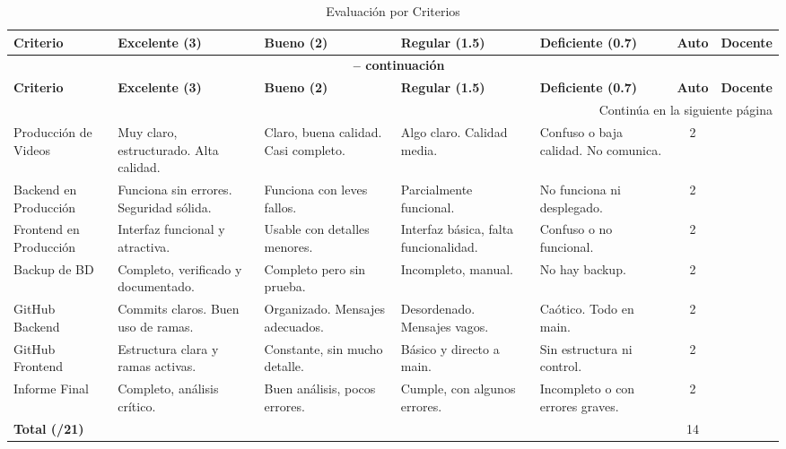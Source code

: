 \documentclass{article}
\begin{document}
       \renewcommand{\arraystretch}{1.3}
       \newpage
\begin{longtable}{|p{2.4cm}|p{2.5cm}|p{2.3cm}|p{2.3cm}|p{2.3cm}|c|c|}
\caption{Evaluación por Criterios} \\
\hline
\textbf{Criterio} &
\textbf{Excelente (3)} &
\textbf{Bueno (2)} &
\textbf{Regular (1.5)} &
\textbf{Deficiente (0.7)} &
\textbf{Auto} &
\textbf{Docente} \\
\hline
\endfirsthead

\multicolumn{7}{c}{{\bfseries \tablename\ \thetable{} -- continuación}} \\
\hline
\textbf{Criterio} &
\textbf{Excelente (3)} &
\textbf{Bueno (2)} &
\textbf{Regular (1.5)} &
\textbf{Deficiente (0.7)} &
\textbf{Auto} &
\textbf{Docente} \\
\hline
\endhead

\hline \multicolumn{7}{|r|}{{Continúa en la siguiente página}} \\ \hline
\endfoot

\hline
\endlastfoot

Producción de Videos &
Muy claro, estructurado. Alta calidad. &
Claro, buena calidad. Casi completo. &
Algo claro. Calidad media. &
Confuso o baja calidad. No comunica. &
 2 & \\
\hline

Backend en Producción &
Funciona sin errores. Seguridad sólida. &
Funciona con leves fallos. &
Parcialmente funcional. &
No funciona ni desplegado. &
 2 & \\
\hline

Frontend en Producción &
Interfaz funcional y atractiva. &
Usable con detalles menores. &
Interfaz básica, falta funcionalidad. &
Confuso o no funcional. &
 2 & \\
\hline

Backup de BD &
Completo, verificado y documentado. &
Completo pero sin prueba. &
Incompleto, manual. &
No hay backup. &
 2 & \\
\hline

GitHub Backend &
Commits claros. Buen uso de ramas. &
Organizado. Mensajes adecuados. &
Desordenado. Mensajes vagos. &
Caótico. Todo en main. &
 2 & \\
\hline

GitHub Frontend &
Estructura clara y ramas activas. &
Constante, sin mucho detalle. &
Básico y directo a main. &
Sin estructura ni control. &
 2 & \\
\hline

Informe Final &
Completo, análisis crítico. &
Buen análisis, pocos errores. &
Cumple, con algunos errores. &
Incompleto o con errores graves. &
 2 & \\
\hline

\textbf{Total (/21)} & & & & & 14 & \\
\hline
\end{longtable}
\end{document}
